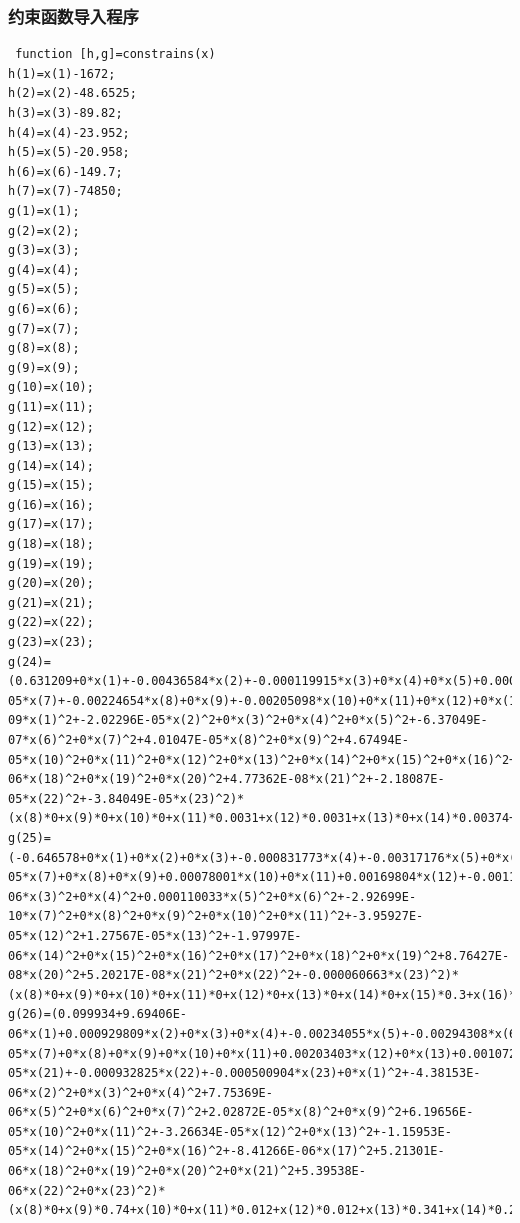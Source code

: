 \documentclass[12pt]{article}%
\begin{document}
 \subsubsection{约束函数导入程序}
 \begin{lstlisting}
 function [h,g]=constrains(x)
h(1)=x(1)-1672;
h(2)=x(2)-48.6525;
h(3)=x(3)-89.82;
h(4)=x(4)-23.952;
h(5)=x(5)-20.958;
h(6)=x(6)-149.7;
h(7)=x(7)-74850;
g(1)=x(1);
g(2)=x(2);
g(3)=x(3);
g(4)=x(4);
g(5)=x(5);
g(6)=x(6);
g(7)=x(7);
g(8)=x(8);
g(9)=x(9);
g(10)=x(10);
g(11)=x(11);
g(12)=x(12);
g(13)=x(13);
g(14)=x(14);
g(15)=x(15);
g(16)=x(16);
g(17)=x(17);
g(18)=x(18);
g(19)=x(19);
g(20)=x(20);
g(21)=x(21);
g(22)=x(22);
g(23)=x(23);
g(24)=(0.631209+0*x(1)+-0.00436584*x(2)+-0.000119915*x(3)+0*x(4)+0*x(5)+0.000185506*x(6)+1.60724E-05*x(7)+-0.00224654*x(8)+0*x(9)+-0.00205098*x(10)+0*x(11)+0*x(12)+0*x(13)+0*x(14)+0*x(15)+-0.00016388*x(16)+0.000446447*x(17)+0.00181601*x(18)+-0.00504081*x(19)+-0.000215367*x(20)+-0.000301199*x(21)+0.00333871*x(22)+0*x(23)+4.69113E-09*x(1)^2+-2.02296E-05*x(2)^2+0*x(3)^2+0*x(4)^2+0*x(5)^2+-6.37049E-07*x(6)^2+0*x(7)^2+4.01047E-05*x(8)^2+0*x(9)^2+4.67494E-05*x(10)^2+0*x(11)^2+0*x(12)^2+0*x(13)^2+0*x(14)^2+0*x(15)^2+0*x(16)^2+0*x(17)^2+-7.78204E-06*x(18)^2+0*x(19)^2+0*x(20)^2+4.77362E-08*x(21)^2+-2.18087E-05*x(22)^2+-3.84049E-05*x(23)^2)*(x(8)*0+x(9)*0+x(10)*0+x(11)*0.0031+x(12)*0.0031+x(13)*0+x(14)*0.00374+x(15)*0+x(16)*0.017+x(17)*0.0006+x(18)*0.0006+x(19)*0.96+x(20)*0.017+x(21)*0.017+x(22)*0.3+x(23)*0.225692308)+x(2)-0.0019*x(7);
g(25)=(-0.646578+0*x(1)+0*x(2)+0*x(3)+-0.000831773*x(4)+-0.00317176*x(5)+0*x(6)+5.30131E-05*x(7)+0*x(8)+0*x(9)+0.00078001*x(10)+0*x(11)+0.00169804*x(12)+-0.00113877*x(13)+0*x(14)+0*x(15)+-0.000401287*x(16)+0*x(17)+0*x(18)+0*x(19)+-0.000598859*x(20)+-0.000537688*x(21)+0*x(22)+0*x(23)+0*x(1)^2+0*x(2)^2+-5.21388E-06*x(3)^2+0*x(4)^2+0.000110033*x(5)^2+0*x(6)^2+-2.92699E-10*x(7)^2+0*x(8)^2+0*x(9)^2+0*x(10)^2+0*x(11)^2+-3.95927E-05*x(12)^2+1.27567E-05*x(13)^2+-1.97997E-06*x(14)^2+0*x(15)^2+0*x(16)^2+0*x(17)^2+0*x(18)^2+0*x(19)^2+8.76427E-08*x(20)^2+5.20217E-08*x(21)^2+0*x(22)^2+-0.000060663*x(23)^2)*(x(8)*0+x(9)*0+x(10)*0+x(11)*0+x(12)*0+x(13)*0+x(14)*0+x(15)*0.3+x(16)*0.664+x(17)*0+x(18)*0+x(19)*0+x(20)*0.664+x(21)*0.664+x(22)*0+x(23)*0)+x(3)-0.0130*x(7);
g(26)=(0.099934+9.69406E-06*x(1)+0.000929809*x(2)+0*x(3)+0*x(4)+-0.00234055*x(5)+-0.00294308*x(6)+1.09483E-05*x(7)+0*x(8)+0*x(9)+0*x(10)+0*x(11)+0.00203403*x(12)+0*x(13)+0.00107264*x(14)+0*x(15)+0*x(16)+0*x(17)+-0.00227124*x(18)+0*x(19)+-0.000101107*x(20)+-9.86571E-05*x(21)+-0.000932825*x(22)+-0.000500904*x(23)+0*x(1)^2+-4.38153E-06*x(2)^2+0*x(3)^2+0*x(4)^2+7.75369E-06*x(5)^2+0*x(6)^2+0*x(7)^2+2.02872E-05*x(8)^2+0*x(9)^2+6.19656E-05*x(10)^2+0*x(11)^2+-3.26634E-05*x(12)^2+0*x(13)^2+-1.15953E-05*x(14)^2+0*x(15)^2+0*x(16)^2+-8.41266E-06*x(17)^2+5.21301E-06*x(18)^2+0*x(19)^2+0*x(20)^2+0*x(21)^2+5.39538E-06*x(22)^2+0*x(23)^2)*(x(8)*0+x(9)*0.74+x(10)*0+x(11)*0.012+x(12)*0.012+x(13)*0.341+x(14)*0.285+x(15)*0.3+x(16)*0.072+x(17)*0.767+x(18)*0.767+x(19)*0+x(20)*0.172+x(21)*0.172+x(22)*0.56+x(23)*0.392)+x(6)-0.005*x(7);

\end{lstlisting}
\end{document}
